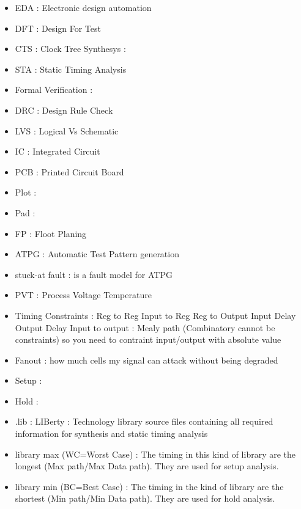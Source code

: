 \documentclass[11pt,a4paper,sans]{report}
\begin{document}
\begin{itemize}
	\item EDA : Electronic design automation
	\item DFT : Design For Test %
	\item CTS : Clock Tree Synthesys : %
	\item STA : Static Timing Analysis  %

	\item Formal Verification :
	\item DRC : Design Rule Check %
	\item LVS : Logical Vs Schematic %
	\item IC : Integrated Circuit
	\item PCB : Printed Circuit Board
	\item Plot : %
	\item Pad : %
	\item FP : Floot Planing %
	\item ATPG : Automatic Test Pattern generation
	\item stuck-at fault : is a fault model for ATPG %

	\item PVT : Process Voltage Temperature %

	\item Timing Constraints :
		Reg to Reg
		Input to Reg
		Reg to Output
		Input Delay
		Output Delay
		Input to output : Mealy path (Combinatory cannot be constraints) so you need to contraint input/output with absolute value


	\item Fanout : how much cells my signal can attack without being degraded

	\item Setup :
	\item Hold :

	\item .lib : LIBerty : Technology library source files containing all required information for synthesis and static timing analysis

	\item library max (WC=Worst Case) : The timing in this kind of library are the longest (Max path/Max Data path). They are used for setup analysis. 
	\item library min (BC=Best Case) : The timing in the kind of library are the shortest (Min path/Min Data path). They are used for hold analysis.
	


\end{itemize}
\end{document}
